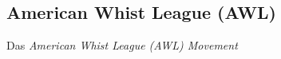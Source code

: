 \subsection{American Whist League (AWL)}

\noindent
Das \textit{American Whist League (AWL) Movement}
